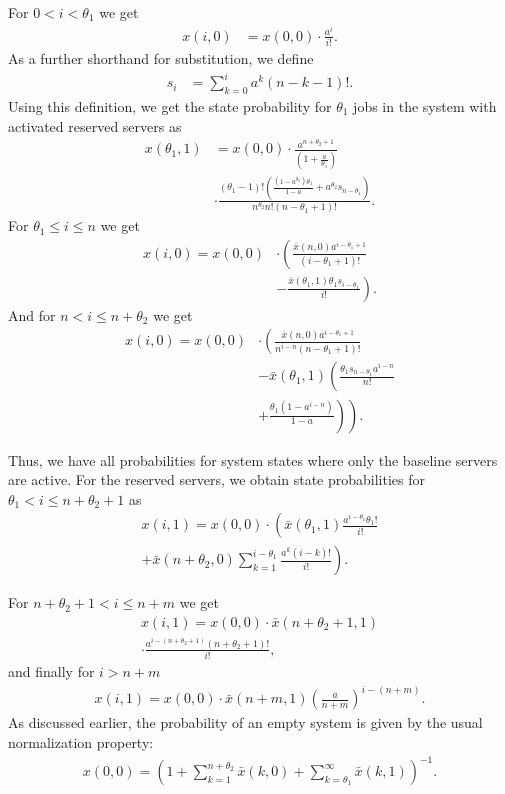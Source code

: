 For \(0 < i <\theta_1\) we get
\begin{align*}
x(i, 0) &= x(0, 0) \cdot \frac{a^i}{i!}.
\end{align*}
As a further shorthand for substitution, we define
\begin{align*}
s_i&=\sum_{k=0}^{i}a^k(n-k-1)!.
\end{align*}
Using this definition, we get the state probability for \(\theta_1\) jobs in the system with activated reserved servers as
\begin{align*}
x(\theta_1, 1) &= x(0, 0)\cdot \frac{a^{n+\theta_2+1}}{\left(1+\frac{a}{\theta_1}\right)}\\
&\cdot\frac{\left(\theta_1-1\right)!\left(\frac{(1-a^{\theta_2})\theta_1}{1-a}+a^{\theta_2}s_{n-\theta_1}\right)}{n^{\theta_2}n!\left(n-\theta_1+1\right)!}.
\end{align*}
For \(\theta_1\leq i\leq n\) we get
\begin{align*}
x(i, 0) = x(0, 0) &\cdot \left(\frac{\bar{x}(n, 0) a^{i-\theta_1+1}}{(i-\theta_1+1)!}\right.\\
&\left.- \frac{\bar{x}(\theta_1,1) \theta_1 s_{i-\theta_1}}{i!}\right).
\end{align*}
And for \(n<i\leq n+\theta_2\) we get
\begin{align*}
x(i, 0) = x(0, 0) &\cdot \left(\frac{\bar{x}(n,0) a^{i-\theta_1+1}}{n^{i-n}(n-\theta_1+1)!}\right.\\
&\left.-\bar{x}(\theta_1,1)\left(\frac{\theta_1 s_{n-\theta_1} a^{i-n}}{n!}\right.\right.\\
&\left.\left.+ \frac{\theta_1(1-a^{i-n})}{1-a}\right)\right).
\end{align*}

Thus, we have all probabilities for system states where only the baseline servers are active. For the reserved servers, we obtain state probabilities for \(\theta_1<i\leq n+\theta_2+1\) as
\begin{align*}
x(i, 1) = x(0, 0) \cdot \left(\bar{x}(\theta_1, 1)\frac{a^{i-\theta_1}\theta_1!}{i!}\right.\\
\left.+\bar{x}(n+\theta_2,0)\sum_{k=1}^{i-\theta_1}\frac{a^k(i-k)!}{i!}\right).
\end{align*}

For \(n+\theta_2+1 < i \leq n + m\) we get
\begin{align*}
x(i, 1) = x(0, 0)\cdot \bar{x}(n+\theta_2+1,1)\\ \cdot\frac{a^{i-(n+\theta_2+1)}(n+\theta_2+1)!}{i!},
\end{align*}
and finally for \(i>n+m\)
\begin{align*}
x(i, 1) = x(0, 0)\cdot \bar{x}(n+m,1) \left(\frac{a}{n+m}\right)^{i-(n+m)}.
\end{align*}
As discussed earlier, the probability of an empty system is given by the usual normalization property:
\begin{align*}
x(0, 0)=\left(1 +\sum_{k=1}^{n+\theta_2}\bar{x}(k, 0) + \sum_{k=\theta_1}^{\infty}\bar{x}(k,1)\right)^{-1}.
\end{align*}

